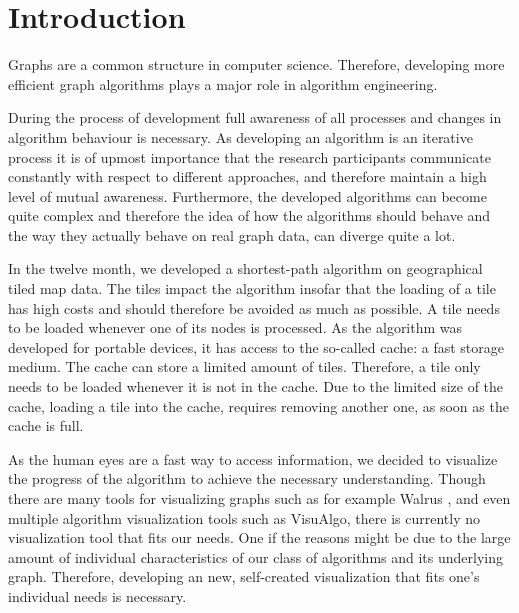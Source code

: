 \documentclass
[
    paper = a4,
    pagesize,
    12 pt,
    oneside,                       %
    open = right,
    DIV = calc,
    BCOR = 0 mm,                   %
    bibtotoc
]
{scrbook}
\begin{document}
\frontmatter







\mainmatter
\chapter{Introduction} \label{introduction}
Graphs are a common structure in computer science.
Therefore, developing more efficient graph algorithms plays a major role in algorithm engineering.

During the process of development full awareness of all processes and changes in algorithm behaviour is necessary.
As developing an algorithm is an iterative process it is of upmost importance that the research participants communicate constantly with respect to different approaches, and therefore maintain a high level of mutual awareness.
Furthermore, the developed algorithms can become quite complex and therefore the idea of how the algorithms should behave and the way they actually behave on real graph data, can diverge quite a lot.

In the twelve month, we developed a shortest-path algorithm on geographical tiled map data.
The tiles impact the algorithm insofar that the loading of a tile has high costs and should therefore be avoided as much as possible.
A tile needs to be loaded whenever one of its nodes is processed.
As the algorithm was developed for portable devices, it has access to the so-called cache: a fast storage medium.
The cache can store a limited amount of tiles.
Therefore, a tile only needs to be loaded whenever it is not in the cache.
Due to the limited size of the cache, loading a tile into the cache, requires removing another one, as soon as the cache is full.

As the human eyes are a fast way to access information, we decided to visualize the progress of the algorithm to achieve the necessary understanding.
Though there are many tools for visualizing graphs such as for example Walrus \cite{walrus}, and even multiple algorithm visualization tools such as VisuAlgo\cite{visualgo}, there is currently no visualization tool that fits our needs.
One if the reasons might be due to the large amount of individual characteristics of our class of algorithms and its underlying graph.
Therefore, developing an new, self-created visualization that fits one's individual needs is necessary.
\end{document}
